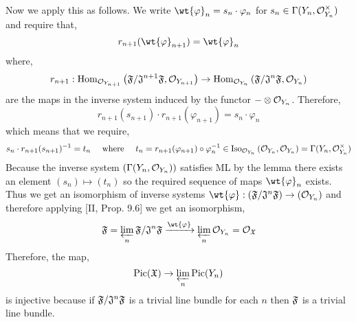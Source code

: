 \documentclass[12pt]{article}
\begin{document}
\begin{enumerate}
Now we apply this as follows. We write $\wt{\varphi}_n = s_n \cdot \varphi_n$ for $s_n \in \Gamma(Y_n, \mathcal{O}_{Y_n}^\times)$ and require that,
\[ r_{n+1}(\wt{\varphi}_{n+1}) = \wt{\varphi}_n \]
where,
\[ r_{n+1} : \mathrm{Hom}_{\mathcal{O}_{Y_{n+1}}} \left( \mathfrak{F} / \mathfrak{J}^{n+1} \mathfrak{F}, \mathcal{O}_{Y_{n+1}} \right) \to \mathrm{Hom}_{\mathcal{O}_{Y_{n}}} \left( \mathfrak{F} / \mathfrak{J}^{n} \mathfrak{F}, \mathcal{O}_{Y_{n}} \right) \]
are the maps in the inverse system induced by the functor $- \otimes \mathcal{O}_{Y_n}$. Therefore, 
\[ r_{n+1}(s_{n+1}) \cdot r_{n+1}(\varphi_{n+1}) = s_n \cdot \varphi_n \]
which means that we require,
\[ s_n \cdot r_{n+1}(s_{n+1})^{-1} = t_n \quad \text{ where } \quad t_n = r_{n+1}(\varphi_{n+1}) \circ \varphi_n^{-1} \in \mathrm{Iso}_{\mathcal{O}_{Y_n}} \left( \mathcal{O}_{Y_n}, \mathcal{O}_{Y_n} \right) = \Gamma(Y_n, \mathcal{O}_{Y_n}^\times) \]
Because the inverse system $(\Gamma(Y_n, \mathcal{O}_{Y_n}))$ satisfies ML by the lemma there exists an element $(s_n) \mapsto (t_n)$ so the required sequence of maps $\wt{\varphi}_n$ exists. Thus we get an isomorphism of inverse systems $\wt{\varphi} : (\fF / \fJ^n \fF) \to (\struct{Y_n})$ and therefore applying [II, Prop. 9.6] we get an isomorphism,
\[ \fF = \varprojlim_n \fF / \fJ^n \fF \xrightarrow{\wt{\varphi}} \varprojlim_n \struct{Y_n} = \struct{\fX} \] 
Therefore, the map,
\[ \mathrm{Pic}(\mathfrak{X}) \to \varprojlim_n \mathrm{Pic}(Y_n) \]
is injective because if $\mathfrak{F} / \mathfrak{J}^n \mathfrak{F}$ is a trivial line bundle for each $n$ then $\mathfrak{F}$ is a trivial line bundle.


\end{enumerate}
\end{document}
